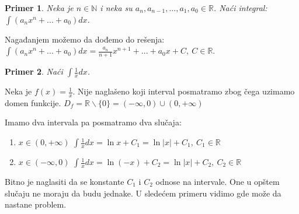 \documentclass{article}
\newtheorem{prim}{Primer}[section]
\begin{document}
\begin{primbox}
    \begin{prim}
        Neka je $n \in \mathbb{N}$ i neka su $a_n, a_{n-1},
            ..., a_1, a_0 \in \mathbb{R}$. Naći integral:
        $\int (a_n  x^n + ... + a_0)dx$.
    \end{prim}
    Nagađanjem možemo da dođemo do rešenja:
    $\int (a_n  x^n + ... + a_0)dx=\frac{a_n}{n+1}x^{n+1} + ... +
        a_0x + C,\ C\in\mathbb{R}$.
\end{primbox}


\begin{primbox}
    \begin{prim}
        Naći $\int\frac{1}{x}dx$.
    \end{prim}
    Neka je $f(x) = \frac{1}{x}$.
    Nije naglašeno koji interval posmatramo zbog čega uzimamo domen
    funkcije.
    $D_f= \mathbb{R}\backslash \{0\} =
        (-\infty, 0)\cup(0, +\infty)$\par
    Imamo dva intervala pa posmatramo dva slučaja:
    \begin{enumerate}[leftmargin=2cm, label=\arabic*. slučaj:]
        \item $x \in (0, +\infty)$ $\int \frac{1}{x}dx =
                  \ln x + C_1=\ln|x| + C_1,\ C_1\in\mathbb{R}$
        \item $x \in (-\infty, 0)$ $\int \frac{1}{x}dx =
                  \ln(-x) + C_2=\ln|x| + C_2,\ C_2\in\mathbb{R}$
    \end{enumerate}
\end{primbox}
Bitno je naglasiti da se konstante $C_1$ i $C_2$ odnose na intervale. One
u opštem slučaju ne moraju da budu jednake.
U sledećem primeru vidimo gde može da nastane problem.
\end{document}
